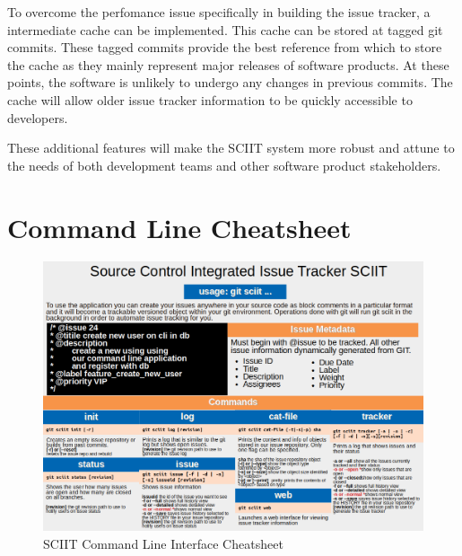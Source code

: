 \documentclass{mproj}
\begin{document}
To overcome the perfomance issue specifically in building the issue tracker, a intermediate cache can be implemented. This cache can be stored at tagged git commits. These tagged commits provide the best reference from which to store the cache as they mainly represent major releases of software products. At these points, the software is unlikely to undergo any changes in previous commits. The cache will allow older issue tracker information to be quickly accessible to developers.

These additional features will make the SCIIT system more robust and attune to the needs of both development teams and other software product stakeholders.


\appendix %
\chapter{Command Line Cheatsheet}
\begin{figure}[h!]
\caption{SCIIT Command Line Interface Cheatsheet}
\label{fig:sciit-cheatsheet}
\centering
\includegraphics[width=16cm]{Cheatsheet}
\end{figure}




\end{document}
